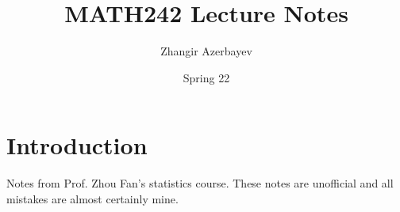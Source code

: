 \documentclass[oneside]{book}
\title{{\bf MATH242 Lecture Notes}}
\author{Zhangir Azerbayev}
\date{Spring 22}
\begin{document}
\maketitle
\frontmatter
\chapter{Introduction}
Notes from Prof. Zhou Fan's statistics course. These notes are unofficial and all mistakes are almost certainly mine. 
\tableofcontents
\mainmatter




\end{document}

